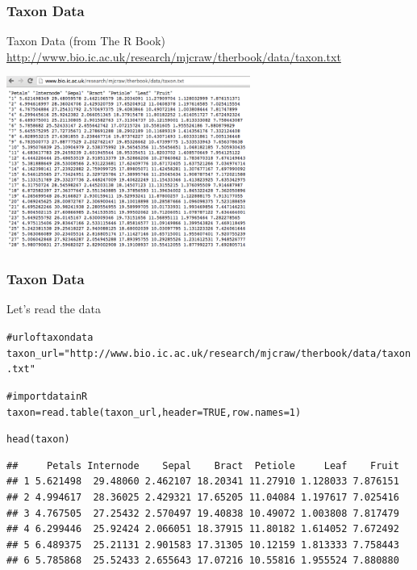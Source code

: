 \documentclass{beamer}\usepackage[]{graphicx}\usepackage[]{color}
\makeatletter
\newcommand{\hlnum}[1]{\textcolor[rgb]{0.063,0.58,0.627}{#1}}%
\newcommand{\hlstr}[1]{\textcolor[rgb]{0.063,0.58,0.627}{#1}}%
\newcommand{\hlcom}[1]{\textcolor[rgb]{0.588,0.588,0.588}{#1}}%
\newcommand{\hlstd}[1]{\textcolor[rgb]{0.196,0.196,0.196}{#1}}%
\newcommand{\hlkwb}[1]{\textcolor[rgb]{0.627,0,0.314}{#1}}%
\newcommand{\hlkwc}[1]{\textcolor[rgb]{0,0.631,0.314}{#1}}%
\newcommand{\hlkwd}[1]{\textcolor[rgb]{0.78,0.227,0.412}{#1}}%
\newenvironment{kframe}{%
 \def\at@end@of@kframe{}%
 \ifinner\ifhmode%
  \def\at@end@of@kframe{\end{minipage}}%
  \begin{minipage}{\columnwidth}%
 \fi\fi%
 \def\FrameCommand##1{\hskip\@totalleftmargin \hskip-\fboxsep
 \colorbox{shadecolor}{##1}\hskip-\fboxsep
     \hskip-\linewidth \hskip-\@totalleftmargin \hskip\columnwidth}%
 \MakeFramed {\advance\hsize-\width
   \@totalleftmargin\z@ \linewidth\hsize
   \@setminipage}}%
 {\par\unskip\endMakeFramed%
 \at@end@of@kframe}
\newenvironment{knitrout}{}{} %
\makeatother
\begin{document}
\begin{frame}
\frametitle{Taxon Data}

Taxon Data (from The R Book) \\
{\scriptsize \url{http://www.bio.ic.ac.uk/research/mjcraw/therbook/data/taxon.txt}}
\begin{center}
\includegraphics[width=8cm]{images/taxon_data.png}
\end{center}

\end{frame}


\begin{frame}[fragile]
\frametitle{Taxon Data}

Let's read the data 

\begin{knitrout}\tiny
{}\color{fgcolor}\begin{kframe}
\begin{alltt}
\hlcom{# url of taxon data}
\hlstd{taxon_url} \hlkwb{=} \hlstr{"http://www.bio.ic.ac.uk/research/mjcraw/therbook/data/taxon.txt"}

\hlcom{# import data in R}
\hlstd{taxon} \hlkwb{=} \hlkwd{read.table}\hlstd{(taxon_url,} \hlkwc{header} \hlstd{=} \hlnum{TRUE}\hlstd{,} \hlkwc{row.names} \hlstd{=} \hlnum{1}\hlstd{)}
\end{alltt}
\end{kframe}
\end{knitrout}

\begin{knitrout}\tiny
{}\color{fgcolor}\begin{kframe}
\begin{alltt}
\hlkwd{head}\hlstd{(taxon)}
\end{alltt}
\begin{verbatim}
##     Petals Internode    Sepal    Bract  Petiole     Leaf    Fruit
## 1 5.621498  29.48060 2.462107 18.20341 11.27910 1.128033 7.876151
## 2 4.994617  28.36025 2.429321 17.65205 11.04084 1.197617 7.025416
## 3 4.767505  27.25432 2.570497 19.40838 10.49072 1.003808 7.817479
## 4 6.299446  25.92424 2.066051 18.37915 11.80182 1.614052 7.672492
## 5 6.489375  25.21131 2.901583 17.31305 10.12159 1.813333 7.758443
## 6 5.785868  25.52433 2.655643 17.07216 10.55816 1.955524 7.880880
\end{verbatim}
\end{kframe}
\end{knitrout}

\end{frame}
\end{document}
